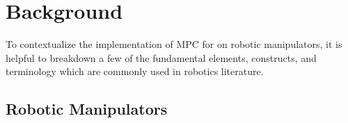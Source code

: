 \documentclass[journal]{IEEEtran}
\begin{document}
%
%
%
%
%
%
%
%
%
%
%
%


\section{Background}

To contextualize the implementation of MPC for on robotic manipulators, it is helpful to breakdown a few of the fundamental elements, constructs, and terminology which are commonly used in robotics literature.

\subsection{Robotic Manipulators}
\end{document}
